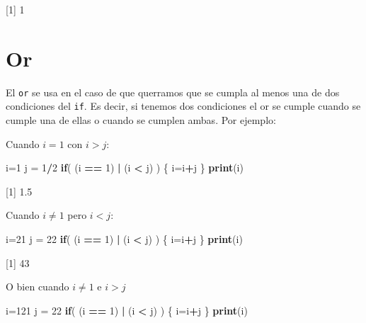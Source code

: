 \documentclass[
]{book}
\newenvironment{Shaded}{\begin{snugshade}}{\end{snugshade}}
\newcommand{\ControlFlowTok}[1]{\textcolor[rgb]{0.13,0.29,0.53}{\textbf{#1}}}
\newcommand{\DecValTok}[1]{\textcolor[rgb]{0.00,0.00,0.81}{#1}}
\newcommand{\KeywordTok}[1]{\textcolor[rgb]{0.13,0.29,0.53}{\textbf{#1}}}
\newcommand{\NormalTok}[1]{#1}
\newcommand{\OperatorTok}[1]{\textcolor[rgb]{0.81,0.36,0.00}{\textbf{#1}}}
\newcommand{\StringTok}[1]{\textcolor[rgb]{0.31,0.60,0.02}{#1}}
\begin{document}
{[}1{]} 1

\hypertarget{or}{%
\section{Or}\label{or}}

El \texttt{or} se usa en el caso de que querramos que se cumpla al menos una de dos condiciones del \texttt{if}. Es decir, si tenemos dos condiciones el or se cumple cuando se cumple una de ellas o cuando se cumplen ambas. Por ejemplo:

Cuando \(i = 1\) con \(i > j\):

\begin{Shaded}
\begin{Highlighting}[]
\NormalTok{i=}\DecValTok{1}
\NormalTok{j =}\StringTok{ }\DecValTok{1}\OperatorTok{/}\DecValTok{2}
\ControlFlowTok{if}\NormalTok{( (i }\OperatorTok{==}\StringTok{ }\DecValTok{1}\NormalTok{) }\OperatorTok{|}\StringTok{ }\NormalTok{(i }\OperatorTok{<}\StringTok{ }\NormalTok{j) ) \{}
\NormalTok{i=i}\OperatorTok{+}\NormalTok{j}
\NormalTok{\}}
\KeywordTok{print}\NormalTok{(i)}
\end{Highlighting}
\end{Shaded}

{[}1{]} 1.5

Cuando \(i \neq 1\) pero \(i < j\):

\begin{Shaded}
\begin{Highlighting}[]
\NormalTok{i=}\DecValTok{21}
\NormalTok{j =}\StringTok{ }\DecValTok{22}
\ControlFlowTok{if}\NormalTok{( (i }\OperatorTok{==}\StringTok{ }\DecValTok{1}\NormalTok{) }\OperatorTok{|}\StringTok{ }\NormalTok{(i }\OperatorTok{<}\StringTok{ }\NormalTok{j) ) \{}
\NormalTok{i=i}\OperatorTok{+}\NormalTok{j}
\NormalTok{\}}
\KeywordTok{print}\NormalTok{(i)}
\end{Highlighting}
\end{Shaded}

{[}1{]} 43

O bien cuando \(i \neq 1\) e \(i > j\)

\begin{Shaded}
\begin{Highlighting}[]
\NormalTok{i=}\DecValTok{121}
\NormalTok{j =}\StringTok{ }\DecValTok{22}
\ControlFlowTok{if}\NormalTok{( (i }\OperatorTok{==}\StringTok{ }\DecValTok{1}\NormalTok{) }\OperatorTok{|}\StringTok{ }\NormalTok{(i }\OperatorTok{<}\StringTok{ }\NormalTok{j) ) \{}
\NormalTok{i=i}\OperatorTok{+}\NormalTok{j}
\NormalTok{\}}
\KeywordTok{print}\NormalTok{(i)}
\end{Highlighting}
\end{Shaded}
\end{document}
